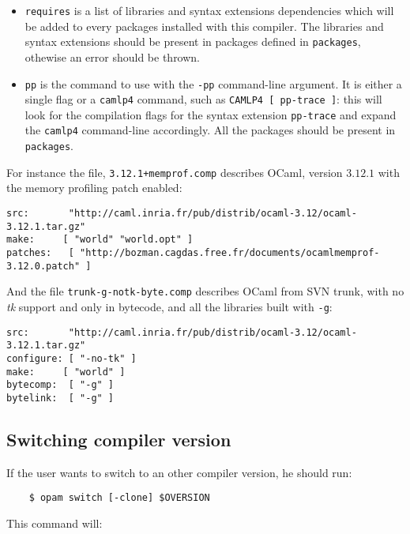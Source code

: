 \documentclass[a4paper,11pt]{article}
\begin{document}
\begin{itemize}
\item {\tt requires} is a list of libraries and syntax extensions
  dependencies which will be added to every packages installed with
  this compiler. The libraries and syntax extensions should be present
  in packages defined in {\tt packages}, othewise an error should be
  thrown.

\item {\tt pp} is the command to use with the {\tt -pp} command-line
  argument. It is either a single flag or a {\tt camlp4} command,
  such as {\tt CAMLP4 [ pp-trace ]}: this will look for the
  compilation flags for the syntax extension {\tt pp-trace} and expand
  the {\tt camlp4} command-line accordingly. All the packages should
  be present in {\tt packages}.

\end{itemize}

For instance the file, {\tt 3.12.1+memprof.comp} describes OCaml,
version $3.12.1$ with the memory profiling patch enabled:

\begin{verbatim}
src:       "http://caml.inria.fr/pub/distrib/ocaml-3.12/ocaml-3.12.1.tar.gz"
make:     [ "world" "world.opt" ]
patches:   [ "http://bozman.cagdas.free.fr/documents/ocamlmemprof-3.12.0.patch" ]
\end{verbatim}

And the file {\tt trunk-g-notk-byte.comp} describes OCaml from SVN
trunk, with no {\em tk} support and only in bytecode, and all the
libraries built with {\tt -g}:

\begin{verbatim}
src:       "http://caml.inria.fr/pub/distrib/ocaml-3.12/ocaml-3.12.1.tar.gz"
configure: [ "-no-tk" ]
make:     [ "world" ]
bytecomp:  [ "-g" ]
bytelink:  [ "-g" ]
\end{verbatim}

\subsection{Switching compiler version}

If the user wants to switch to an other compiler version, he should run:

\begin{verbatim}
    $ opam switch [-clone] $OVERSION
\end{verbatim}

This command will:
\end{document}
